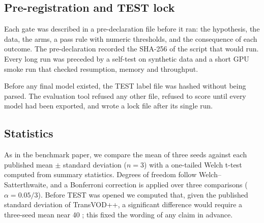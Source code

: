 \subsection{Pre-registration and TEST lock}
Each gate was described in a pre-declaration file before it ran: the hypothesis, the data, the arms, a pass rule with numeric thresholds, and the consequence of each outcome. The pre-declaration recorded the SHA-256 of the script that would run. Every long run was preceded by a self-test on synthetic data and a short GPU smoke run that checked resumption, memory and throughput.

Before any final model existed, the TEST label file was hashed without being parsed. The evaluation tool refused any other file, refused to score until every model had been exported, and wrote a lock file after its single run.

\subsection{Statistics}
As in the benchmark paper, we compare the mean of three seeds against each published mean $\pm$ standard deviation ($n=3$) with a one-tailed Welch t-test \citep{welch1947} computed from summary statistics. Degrees of freedom follow Welch--Satterthwaite, and a Bonferroni correction is applied over three comparisons ($\alpha = 0.05/3$). Before TEST was opened we computed that, given the published standard deviation of TransVOD++, a significant difference would require a three-seed mean near 40 \mapthree{}; this fixed the wording of any claim in advance.
